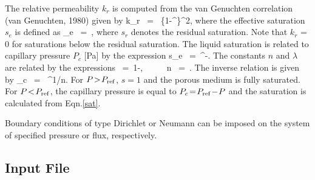 \documentclass[12pt]{article}
\def\EQ#1\EN{\begin{equation}#1\end{equation}}
\newcommand{\eq}{\ =\ }
\begin{document}
The relative permeability $k_r$ is computed from the van Genuchten correlation (van Genuchten, 1980) given by
\EQ\label{krl} 
k_{r} \eq {} \left\{1-^\lambda \right\}^2, 
\EN 
where the effective saturation $s_e$ is defined as
\EQ 
s_e \eq {}, 
\EN 
where $s_r$ denotes the residual saturation. Note that $k_{r}$ = 0 for saturations below the residual saturation. 
The liquid saturation is related to capillary pressure $P_c$ [Pa] by the expression
\EQ\label{sat}
s_e \eq {}^{-\lambda}. 
\EN 
The constants $n$ and $\lambda$ are related by the expressions 
\EQ\label{lambda} 
\lambda \eq 1-, \ \ \ \ \ n \eq {}. 
\EN 
The inverse relation is given by
\EQ
P_c \eq {} ^{1/n}.
\EN
For $P\!>\!P_{\rm ref}$, $s\!=\!1$ and the porous medium is fully saturated. 
For $P\!<\!P_{\rm ref}$, the capillary pressure is equal to $P_c \!=\! P_{\rm ref} \!-\!P$ and the saturation is calculated from Eqn.\eqref{sat}.

Boundary conditions of type Dirichlet or Neumann can be imposed on the system of specified pressure or flux, respectively.

\subsection{Input File}
\end{document}

